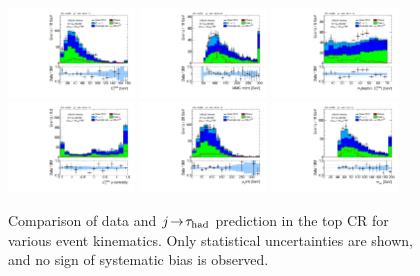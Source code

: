 \begin{figure}[tp]
  \includegraphics[width=0.30\textwidth]{figures/analysis/vbf-topCR/met-pt-hi}
  \includegraphics[width=0.30\textwidth]{figures/analysis/vbf-topCR/mMMC}
  \includegraphics[width=0.30\textwidth]{figures/analysis/vbf-topCR/mT} \\
  \includegraphics[width=0.30\textwidth]{figures/analysis/vbf-topCR/met-phi-centrality}
  \includegraphics[width=0.30\textwidth]{figures/analysis/vbf-topCR/H-pt-hi}
  \includegraphics[width=0.30\textwidth]{figures/analysis/vbf-topCR/mvis} \\
  \caption{Comparison of data and $j\!\rightarrow\!\tau_\text{had}$ prediction in the top CR for various event kinematics. Only statistical uncertainties are shown, and no sign of systematic bias is observed.}
  \label{fig:backgrounds-topCR-taus}
\end{figure}

